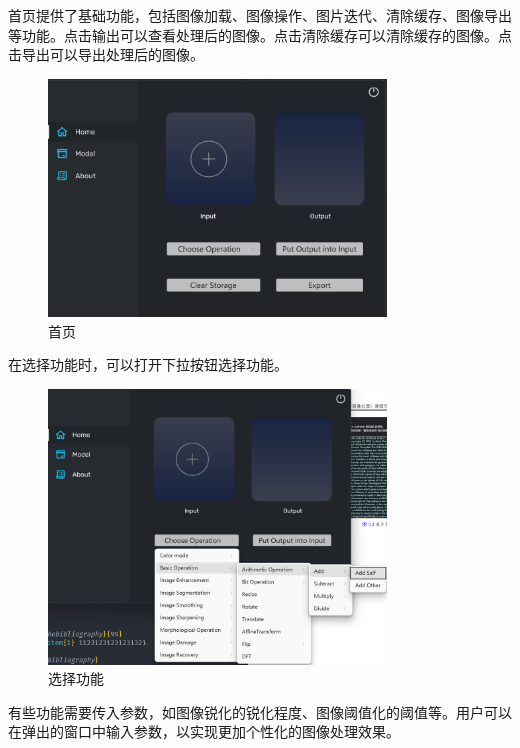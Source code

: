 \documentclass[UTF8,openany]{ctexbook}
\begin{document}
首页提供了基础功能，包括图像加载、图像操作、图片迭代、清除缓存、图像导出等功能。点击输出可以查看处理后的图像。点击清除缓存可以清除缓存的图像。点击导出可以导出处理后的图像。

\begin{figure}[H]
  \centering
  \includegraphics[width=0.8\textwidth]{img/image.png}
  \caption{首页}
\end{figure}

在选择功能时，可以打开下拉按钮选择功能。

\begin{figure}[H]
  \centering
  \includegraphics[width=0.8\textwidth]{img/image-3.png}
  \caption{选择功能}
\end{figure}

有些功能需要传入参数，如图像锐化的锐化程度、图像阈值化的阈值等。用户可以在弹出的窗口中输入参数，以实现更加个性化的图像处理效果。
\end{document}
